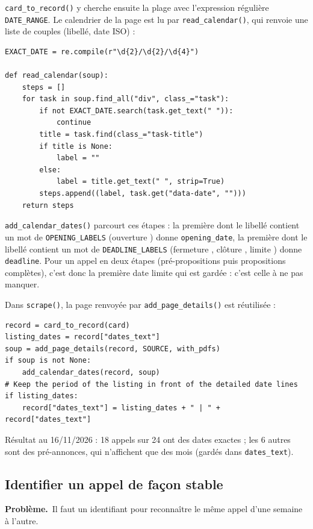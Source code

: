 \documentclass[11pt,a4paper]{article}
\newcommand{\pb}{\par\medskip\noindent\textbf{\textcolor{pbcolor}{Problème.}}\ }
\newcommand{\code}[1]{\texttt{#1}}
\begin{document}
\code{card\_to\_record()} y cherche ensuite la plage avec l'expression régulière
\code{DATE\_RANGE}. Le calendrier de la page est lu par \code{read\_calendar()}, qui
renvoie une liste de couples (libellé, date ISO) :

\begin{lstlisting}
EXACT_DATE = re.compile(r"\d{2}/\d{2}/\d{4}")

def read_calendar(soup):
    steps = []
    for task in soup.find_all("div", class_="task"):
        if not EXACT_DATE.search(task.get_text(" ")):
            continue
        title = task.find(class_="task-title")
        if title is None:
            label = ""
        else:
            label = title.get_text(" ", strip=True)
        steps.append((label, task.get("data-date", "")))
    return steps
\end{lstlisting}

\code{add\_calendar\_dates()} parcourt ces étapes : la première dont le libellé contient
un mot de \code{OPENING\_LABELS} (\og ouverture \fg) donne \code{opening\_date}, la
première dont le libellé contient un mot de \code{DEADLINE\_LABELS} (\og fermeture \fg,
\og clôture \fg, \og limite \fg) donne \code{deadline}. Pour un appel en deux étapes
(pré-propositions puis propositions complètes), c'est donc la première date limite qui
est gardée : c'est celle à ne pas manquer.

Dans \code{scrape()}, la page renvoyée par \code{add\_page\_details()} est réutilisée :

\begin{lstlisting}
record = card_to_record(card)
listing_dates = record["dates_text"]
soup = add_page_details(record, SOURCE, with_pdfs)
if soup is not None:
    add_calendar_dates(record, soup)
# Keep the period of the listing in front of the detailed date lines
if listing_dates:
    record["dates_text"] = listing_dates + " | " + record["dates_text"]
\end{lstlisting}

Résultat au 16/11/2026 : 18 appels sur 24 ont des dates exactes ; les 6 autres sont des
pré-annonces, qui n'affichent que des mois (gardés dans \code{dates\_text}).

\subsection{Identifier un appel de façon stable}

\pb Il faut un identifiant pour reconnaître le même appel d'une semaine à l'autre.
\end{document}
